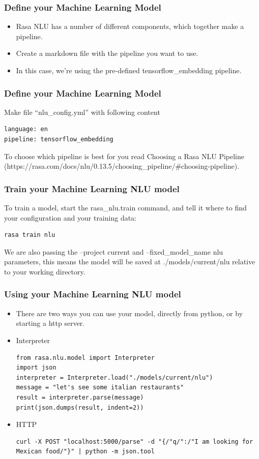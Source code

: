  \begin{frame}[fragile]\frametitle{Define your Machine Learning Model}
 \begin{itemize}
\item Rasa NLU has a number of different components, which together make a pipeline. 
\item Create a markdown file with the pipeline you want to use. 
\item In this case, we're using the pre-defined tensorflow\_embedding pipeline.
\end{itemize}
\end{frame}


 \begin{frame}[fragile]\frametitle{Define your Machine Learning Model}
 Make file ``nlu\_config.yml'' with following content
 \scriptsize
\begin{lstlisting}
language: en
pipeline: tensorflow_embedding
\end{lstlisting}
To choose which pipeline is best for you read Choosing a Rasa NLU Pipeline (https://rasa.com/docs/nlu/0.13.5/choosing\_pipeline/\#choosing-pipeline).
\end{frame}

 \begin{frame}[fragile]\frametitle{Train your Machine Learning NLU model}
To train a model, start the rasa\_nlu.train command, and tell it where to find your configuration and your training data:
\begin{lstlisting}
rasa train nlu
\end{lstlisting}
We are also passing the --project current and --fixed\_model\_name nlu parameters, this means the model will be saved at ./models/current/nlu relative to your working directory.

\end{frame}


 \begin{frame}[fragile]\frametitle{Using your Machine Learning NLU model}
\begin{itemize}
\item There are two ways you can use your model, directly from python, or by starting a http server. 
\item Interpreter
\begin{lstlisting}
from rasa.nlu.model import Interpreter
import json
interpreter = Interpreter.load("./models/current/nlu")
message = "let's see some italian restaurants"
result = interpreter.parse(message)
print(json.dumps(result, indent=2))
\end{lstlisting}
\item HTTP
\begin{lstlisting}
curl -X POST "localhost:5000/parse" -d "{/"q/":/"I am looking for Mexican food/"}" | python -m json.tool
\end{lstlisting}
\end{itemize}

\end{frame}
